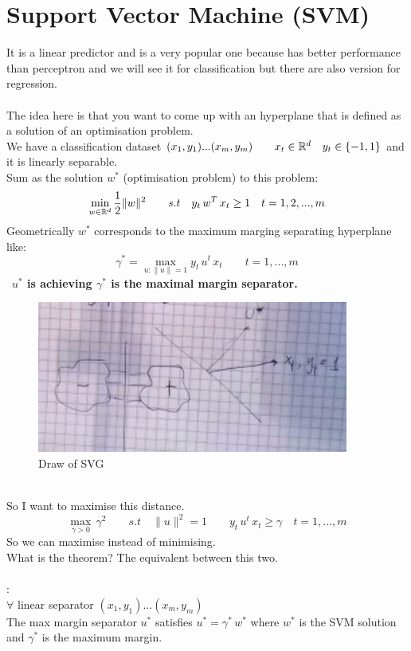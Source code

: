\documentclass[../main.tex]{subfiles}
\begin{document}
\section{Support Vector Machine (SVM)}
It is a linear predictor and is a very popular one because has better performance than perceptron and we will see it for classification but there are also version for regression.
\\\\
The idea here is that you want to come up with an hyperplane that is defined as a solution of an optimisation problem.
\\
We have a classification dataset $(x_1,y_1)...(x_m,y_m) \qquad x_t \in \mathbb{R}^d \quad y_t \in \{ -1,1 \}$ and it is linearly separable.
\\
Sum as the solution $w^*$ (optimisation problem) to this problem:
$$
\min_{w \in \mathbb{R}^d} \frac{1}{2} \| w \|^2 \qquad s.t \quad y_t \, w^T \, x_t \geq 1 \quad t = 1,2,...,m
$$
Geometrically $w^*$ corresponds to the maximum marging separating hyperplane like:
$$
\gamma^* = \max_{u: \|u\|=1} y_t \, u^t \, x_t \qquad t=1,...,m
$$\
\textbf{$u^*$ is achieving $\gamma^*$ is the maximal margin separator.}\\
\begin{figure}[h]
    \centering
    \includegraphics[width=0.4\linewidth]{../img/lez19-img1.JPG}
    \caption{Draw of SVG}
\end{figure}\\
So I want to maximise this distance.
$$
\max_{\gamma > 0} \, \gamma^2 \qquad s.t \quad \| u \|^2 = 1 \qquad y_t \, u^t \, x_t \geq \gamma \quad t=1,...,m
$$
So we can maximise instead of minimising.
\\
What is the theorem? The equivalent between this two.
\\\\
:\\
$\forall$ linear separator $(x_1,y_1)...(x_m,y_m)$ \\
The max margin separator $u^*$ satisfies $u^* = \gamma^* \, w^*$ where $w^*$ is the SVM solution and $\gamma^*$ is the maximum margin.
\end{document}
